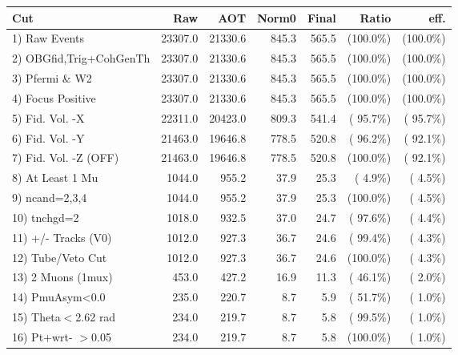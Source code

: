  \begin{table}[h!]\centering
 \begin{tabular}{||l||r|r|r|r|r|r||}
 \hline
 \hline
 Cut & Raw & AOT & Norm0 & Final & Ratio & eff.       \\
 \hline
  1) Raw Events           &      23307.0 &      21330.6 &        845.3 &        565.5 & (100.0\%) & (100.0\%) \\
  2) OBGfid,Trig+CohGenTh &      23307.0 &      21330.6 &        845.3 &        565.5 & (100.0\%) & (100.0\%) \\
  3) Pfermi \& W2         &      23307.0 &      21330.6 &        845.3 &        565.5 & (100.0\%) & (100.0\%) \\
  4) Focus Positive       &      23307.0 &      21330.6 &        845.3 &        565.5 & (100.0\%) & (100.0\%) \\
  5) Fid. Vol. -X         &      22311.0 &      20423.0 &        809.3 &        541.4 & ( 95.7\%) & ( 95.7\%) \\
  6) Fid. Vol. -Y         &      21463.0 &      19646.8 &        778.5 &        520.8 & ( 96.2\%) & ( 92.1\%) \\
  7) Fid. Vol. -Z (OFF)   &      21463.0 &      19646.8 &        778.5 &        520.8 & (100.0\%) & ( 92.1\%) \\
  8) At Least 1 Mu        &       1044.0 &        955.2 &         37.9 &         25.3 & (  4.9\%) & (  4.5\%) \\
  9) ncand=2,3,4          &       1044.0 &        955.2 &         37.9 &         25.3 & (100.0\%) & (  4.5\%) \\
 10) tnchgd=2             &       1018.0 &        932.5 &         37.0 &         24.7 & ( 97.6\%) & (  4.4\%) \\
 11) +/- Tracks (V0)      &       1012.0 &        927.3 &         36.7 &         24.6 & ( 99.4\%) & (  4.3\%) \\
 12) Tube/Veto Cut        &       1012.0 &        927.3 &         36.7 &         24.6 & (100.0\%) & (  4.3\%) \\
 13) 2 Muons (1mux)       &        453.0 &        427.2 &         16.9 &         11.3 & ( 46.1\%) & (  2.0\%) \\
 14) PmuAsym<0.0          &        235.0 &        220.7 &          8.7 &          5.9 & ( 51.7\%) & (  1.0\%) \\
 15) Theta$<$2.62 rad     &        234.0 &        219.7 &          8.7 &          5.8 & ( 99.5\%) & (  1.0\%) \\
 16) Pt+wrt- $>$0.05      &        234.0 &        219.7 &          8.7 &          5.8 & (100.0\%) & (  1.0\%) \\

\end{tabular}
\end{table}
